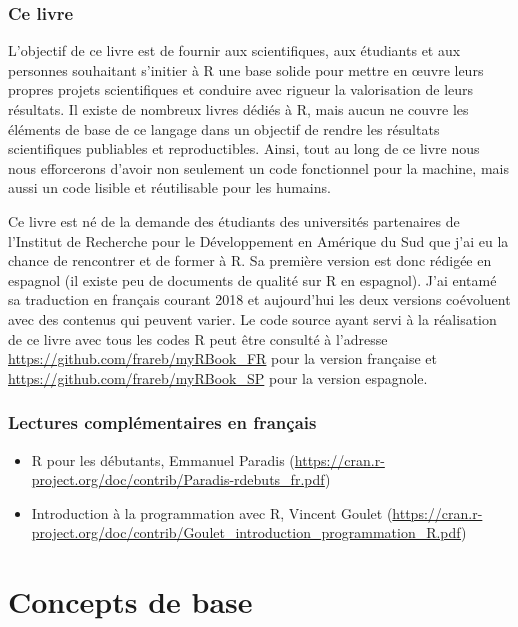 \documentclass[twoside,symmetric]{book}
\providecommand{\tightlist}{%
  \setlength{\itemsep}{0pt}\setlength{\parskip}{0pt}}
\begin{document}
\hypertarget{ce-livre}{%
\section{Ce livre}\label{ce-livre}}

L'objectif de ce livre est de fournir aux scientifiques, aux étudiants et aux personnes souhaitant s'initier à R une base solide pour mettre en œuvre leurs propres projets scientifiques et conduire avec rigueur la valorisation de leurs résultats. Il existe de nombreux livres dédiés à R, mais aucun ne couvre les éléments de base de ce langage dans un objectif de rendre les résultats scientifiques publiables et reproductibles. Ainsi, tout au long de ce livre nous nous efforcerons d'avoir non seulement un code fonctionnel pour la machine, mais aussi un code lisible et réutilisable pour les humains.

Ce livre est né de la demande des étudiants des universités partenaires de l'Institut de Recherche pour le Développement en Amérique du Sud que j'ai eu la chance de rencontrer et de former à R. Sa première version est donc rédigée en espagnol (il existe peu de documents de qualité sur R en espagnol). J'ai entamé sa traduction en français courant 2018 et aujourd'hui les deux versions coévoluent avec des contenus qui peuvent varier. Le code source ayant servi à la réalisation de ce livre avec tous les codes R peut être consulté à l'adresse \url{https://github.com/frareb/myRBook_FR} pour la version française et \url{https://github.com/frareb/myRBook_SP} pour la version espagnole.

\hypertarget{lectures-compluxe9mentaires-en-franuxe7ais}{%
\section{Lectures complémentaires en français}\label{lectures-compluxe9mentaires-en-franuxe7ais}}

\begin{itemize}
\tightlist
\item
  R pour les débutants, Emmanuel Paradis (\url{https://cran.r-project.org/doc/contrib/Paradis-rdebuts_fr.pdf})
\item
  Introduction à la programmation avec R, Vincent Goulet (\url{https://cran.r-project.org/doc/contrib/Goulet_introduction_programmation_R.pdf})
\end{itemize}

\hypertarget{part-concepts-de-base}{%
\part{Concepts de base}\label{part-concepts-de-base}}
\end{document}

